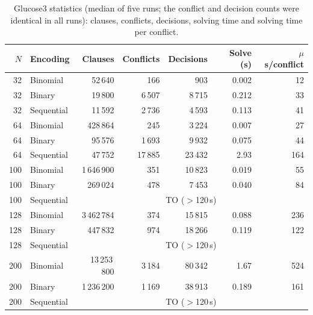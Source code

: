 \documentclass[a4paper,fleqn]{cas-sc}
\begin{document}
\begin{table}[htbp]
\centering
\caption{Glucose3 statistics (median of five runs; the conflict and decision counts were identical in all runs): clauses, conflicts, decisions, solving time and solving time per conflict.}\label{tab:sat}
\small
\setlength{\tabcolsep}{4pt}
\begin{tabular}{r l r r r r r}
\toprule
$N$ & Encoding & Clauses & Conflicts & Decisions & Solve (s) & $\mu$s/conflict\\
\midrule
32 & Binomial & 52\,640 & 166 & 903 & 0.002 & 12\\
32 & Binary & 19\,800 & 6\,507 & 8\,715 & 0.212 & 33\\
32 & Sequential & 11\,592 & 2\,736 & 4\,593 & 0.113 & 41\\
64 & Binomial & 428\,864 & 245 & 3\,224 & 0.007 & 27\\
64 & Binary & 95\,576 & 1\,693 & 9\,932 & 0.075 & 44\\
64 & Sequential & 47\,752 & 17\,885 & 23\,432 & 2.93 & 164\\
100 & Binomial & 1\,646\,900 & 351 & 10\,823 & 0.019 & 55\\
100 & Binary & 269\,024 & 478 & 7\,453 & 0.040 & 84\\
100 & Sequential & \multicolumn{5}{c}{TO ($>$120\,s)}\\
128 & Binomial & 3\,462\,784 & 374 & 15\,815 & 0.088 & 236\\
128 & Binary & 447\,832 & 974 & 18\,266 & 0.119 & 122\\
128 & Sequential & \multicolumn{5}{c}{TO ($>$120\,s)}\\
200 & Binomial & 13\,253\,800 & 3\,184 & 80\,342 & 1.67 & 524\\
200 & Binary & 1\,236\,200 & 1\,169 & 38\,913 & 0.189 & 161\\
200 & Sequential & \multicolumn{5}{c}{TO ($>$120\,s)}\\
\bottomrule
\end{tabular}
\end{table}
\end{document}
